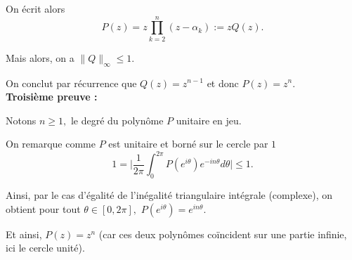 On écrit alors $$P(z)=z\prod_{k=2}^{n}(z-\alpha_{k}):=zQ(z).$$

Mais alors, on a $\displaystyle \|Q\|_{\infty}\leq 1.$

On conclut par récurrence que $Q(z)=z^{n-1}$ et donc $P(z)=z^{n}.$\\

\textbf{Troisième preuve :} 

Notons $n\geq 1,$ le degré du polynôme $P$ unitaire en jeu.

On remarque comme $P$ est unitaire et borné sur le cercle par $1$ $$1=\big\vert \frac{1}{2\pi}\int_{0}^{2\pi}P(e^{i\theta})e^{-in\theta}d\theta \big\vert \leq 1.$$

Ainsi, par le cas d'égalité de l'inégalité triangulaire intégrale (complexe), on obtient pour tout $\theta\in [0,2\pi],$ $\displaystyle P(e^{i\theta})=e^{in\theta}.$

Et ainsi, $P(z)=z^{n}$ (car ces deux polynômes coïncident sur une partie infinie, ici le cercle unité).